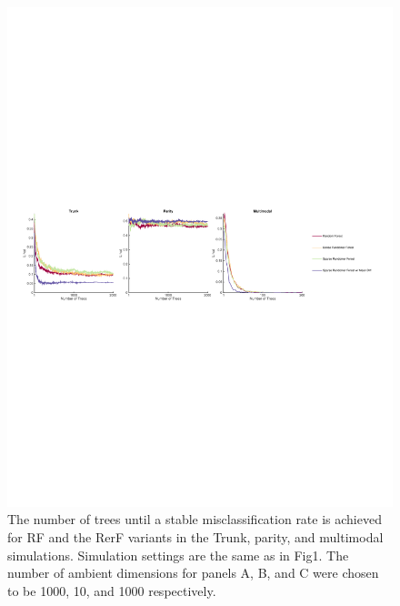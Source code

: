 \documentclass{article} %
\begin{document}
\begin{figure}[h]
\begin{center}
\includegraphics[trim=0in 8in 0in 8in, clip=true, width=\linewidth]{../Figures/pdf/Fig0_nTrees}
\end{center}
\caption{The number of trees until a stable misclassification rate is achieved for RF and the RerF variants in the Trunk, parity, and multimodal simulations. Simulation settings are the same as in Fig1. The number of ambient dimensions for panels A, B, and C were chosen to be 1000, 10, and 1000 respectively.}
\label{fig:ntrees}
\end{figure}
\end{document}
